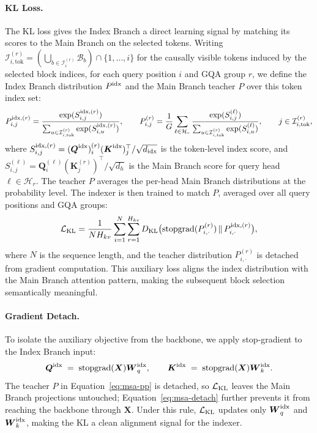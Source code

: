 \documentclass{llmxive}
\providecommand{\bm}[1]{\boldsymbol{#1}}
\providecommand{\Ls}{\mathcal{L}}
\providecommand{\KL}{D_{\mathrm{KL}}}
\providecommand{\sg}{\mathrm{stopgrad}}
\providecommand{\Eqref}[1]{Equation~\ref{#1}}
\providecommand{\mK}{{\bm{K}}}
\providecommand{\mQ}{{\bm{Q}}}
\providecommand{\mW}{{\bm{W}}}
\providecommand{\mX}{{\bm{X}}}
\providecommand{\gB}{{\mathcal{B}}}
\providecommand{\gI}{{\mathcal{I}}}
\begin{document}
\paragraph{KL Loss.} The KL loss gives the Index Branch a direct learning signal by matching its scores to the Main Branch on the selected tokens. Writing $\gI_{i,\mathrm{tok}}^{(r)}=(\bigcup_{b\in\gI_i^{(r)}}\gB_b)\cap\{1,\dots,i\}$ for the causally visible tokens induced by the selected block indices, for each query position $i$ and GQA group $r$, we define the Index Branch distribution $P^{\rm idx}$ and the Main Branch teacher $P$ over this token index set:
\begin{equation}
\label{eq:msa-pp}
P^{{\rm idx},(r)}_{i,j}
= \frac{\exp(S^{{\rm idx},(r)}_{i,j})}
       {\sum_{u\in\gI_{i,\mathrm{tok}}^{(r)}}\exp(S^{{\rm idx},(r)}_{i,u})},
\qquad
P^{(r)}_{i,j}
= \frac{1}{G}\sum_{\ell\in\mathcal{H}_r}
  \frac{\exp(S^{(\ell)}_{i,j})}
       {\sum_{u\in\gI_{i,\mathrm{tok}}^{(r)}}\exp(S^{(\ell)}_{i,u})},
\qquad j\in\gI_{i,\mathrm{tok}}^{(r)},
\end{equation}
where $S^{{\rm idx},(r)}_{i,j} = (\mQ^{\rm idx})^{(r)}_i(\mK^{\rm idx})_j^{\top}/\sqrt{d_{\rm idx}}$ is the token-level index score, and $S^{(\ell)}_{i,j} = \mQ^{(\ell)}_i(\mK^{(r)}_j)^{\top}/\sqrt{d_h}$ is the Main Branch score for query head $\ell\in\mathcal{H}_r$. The teacher $P$ averages the per-head Main Branch distributions at the probability level. The indexer is then trained to match $P$, averaged over all query positions and GQA groups:
\begin{equation}
\label{eq:msa-kl}
\Ls_{\rm KL}
= \frac{1}{NH_{kv}}
  \sum_{i=1}^{N}\sum_{r=1}^{H_{kv}}
  \KL\bigl(\sg(P^{(r)}_{i,\cdot}) \,\|\, P^{{\rm idx},(r)}_{i,\cdot}\bigr),
\end{equation}
where $N$ is the sequence length, and the teacher distribution $P^{(r)}_{i,\cdot}$ is detached from gradient computation. This auxiliary loss aligns the index distribution with the Main Branch attention pattern, making the subsequent block selection semantically meaningful.




\paragraph{Gradient Detach.} To isolate the auxiliary objective from the backbone, we apply stop-gradient to the Index Branch input:
\begin{equation}
\label{eq:msa-detach}
\mQ^{\rm idx} \;=\; \sg(\mX)\mW^{\rm idx}_q,
\qquad
\mK^{\rm idx} \;=\; \sg(\mX)\mW^{\rm idx}_k.
\end{equation}
The teacher $P$ in \Eqref{eq:msa-pp} is detached, so $\Ls_{\rm KL}$ leaves the Main Branch projections untouched; \Eqref{eq:msa-detach} further prevents it from reaching the backbone through $\mX$. Under this rule, $\Ls_{\rm KL}$ updates only $\mW^{\rm idx}_q$ and $\mW^{\rm idx}_k$, making the KL a clean alignment signal for the indexer.
\end{document}
